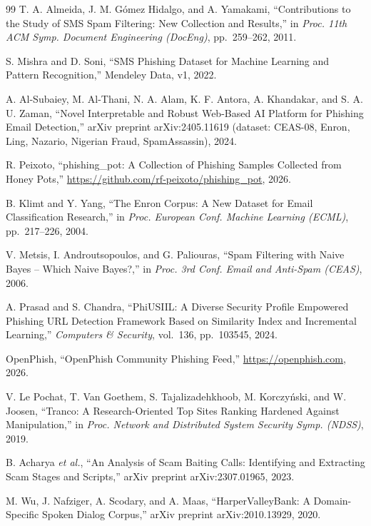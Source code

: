 \begin{thebibliography}{99}
T. A. Almeida, J. M. G{\'o}mez Hidalgo, and A. Yamakami, ``Contributions to the Study of {SMS} Spam Filtering: New Collection and Results,'' in \textit{Proc. 11th ACM Symp. Document Engineering (DocEng)}, pp.~259--262, 2011.

S. Mishra and D. Soni, ``{SMS} Phishing Dataset for Machine Learning and Pattern Recognition,'' Mendeley Data, v1, 2022.

A. Al-Subaiey, M. Al-Thani, N. A. Alam, K. F. Antora, A. Khandakar, and S. A. U. Zaman, ``Novel Interpretable and Robust Web-Based {AI} Platform for Phishing Email Detection,'' arXiv preprint arXiv:2405.11619 (dataset: CEAS-08, Enron, Ling, Nazario, Nigerian Fraud, SpamAssassin), 2024.

R. Peixoto, ``phishing\_pot: A Collection of Phishing Samples Collected from Honey Pots,'' \url{https://github.com/rf-peixoto/phishing_pot}, 2026.

B. Klimt and Y. Yang, ``The {Enron} Corpus: A New Dataset for Email Classification Research,'' in \textit{Proc. European Conf. Machine Learning (ECML)}, pp.~217--226, 2004.

V. Metsis, I. Androutsopoulos, and G. Paliouras, ``Spam Filtering with Naive {B}ayes -- Which Naive {B}ayes?,'' in \textit{Proc. 3rd Conf. Email and Anti-Spam (CEAS)}, 2006.

A. Prasad and S. Chandra, ``{PhiUSIIL}: A Diverse Security Profile Empowered Phishing {URL} Detection Framework Based on Similarity Index and Incremental Learning,'' \textit{Computers \& Security}, vol.~136, pp.~103545, 2024.

OpenPhish, ``{OpenPhish} Community Phishing Feed,'' \url{https://openphish.com}, 2026.

V. Le Pochat, T. Van Goethem, S. Tajalizadehkhoob, M. Korczy{\'n}ski, and W. Joosen, ``Tranco: A Research-Oriented Top Sites Ranking Hardened Against Manipulation,'' in \textit{Proc. Network and Distributed System Security Symp. (NDSS)}, 2019.

B. Acharya \textit{et al.}, ``An Analysis of Scam Baiting Calls: Identifying and Extracting Scam Stages and Scripts,'' arXiv preprint arXiv:2307.01965, 2023.

M. Wu, J. Nafziger, A. Scodary, and A. Maas, ``{HarperValleyBank}: A Domain-Specific Spoken Dialog Corpus,'' arXiv preprint arXiv:2010.13929, 2020.


\end{thebibliography}
